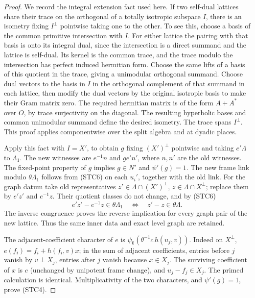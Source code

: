 \begin{proof}
We record the integral extension fact used here.
If two self-dual lattices share their trace on the
orthogonal of a totally isotropic subspace \(I\),
there is an isometry fixing \(I^\perp\) pointwise
taking one to the other. To see this, choose a basis
of the common primitive intersection with \(I\).
For either lattice the pairing with that basis is
onto its integral dual, since the intersection is
a direct summand and the lattice is self-dual.
Its kernel is the common trace, and the trace modulo
the intersection has perfect induced hermitian form.
Choose the same lifts of a basis of this quotient
in the trace, giving a unimodular orthogonal summand.
Choose dual vectors to the basis in \(I\) in the
orthogonal complement of that summand in each
lattice, then modify the dual vectors by the original
isotropic basis to make their Gram matrix zero.
The required hermitian matrix is of the form
\(A+A^*\) over \(O\), by trace surjectivity on the
diagonal. The resulting hyperbolic bases and common
unimodular summand define the desired isometry.
The trace spans \(I^\perp\). This proof applies
componentwise over the split algebra and at dyadic
places.

Apply this fact with \(I=X'\), to obtain \(g\)
fixing \((X')^\perp\) pointwise and taking
\(e'\Lambda\) to \(\Lambda_1\). The new witnesses
are \(e^{-1}n\) and \(ge'n'\), where \(n,n'\)
are the old witnesses. The fixed-point property
of \(g\) implies \(g\in N'\) and \(\psi'(g)=1\).
The new frame link modulo \(\theta\Lambda_1\)
follows from (STC6) on each \(u_i'\), together
with the old link. For the graph datum take old
representatives \(z'\in\Lambda\cap(X')^\perp\),
\(z\in\Lambda\cap X^\perp\); replace them by
\(e'z'\) and \(e^{-1}z\). Their quotient classes
do not change, and by (STC6)
\[
 e'z'-e^{-1}z\in\theta\Lambda_1
      \quad\Longleftrightarrow\quad z'-z\in\theta\Lambda .
\]
The inverse congruence proves the reverse implication
for every graph pair of the new lattice. Thus the
same inner data and exact level graph are retained.

The adjacent-coefficient character of \(e\) is
\(\psi_0(\theta^{-1}c\,h(u_j,v))\).
Indeed on \(X^\perp\), \(e(f_i)=f_i+h(f_i,v)x\);
in the sum of adjacent coefficients, entries before
\(j\) vanish by \(v\perp X_j\), entries after \(j\)
vanish because \(x\in X_j\). The surviving coefficient
of \(x\) is \(c\) (unchanged by unipotent frame change),
and \(u_j-f_j\in X_j\). The primed calculation is
identical. Multiplicativity of the two characters,
and \(\psi'(g)=1\), prove (STC4).


\end{proof}
